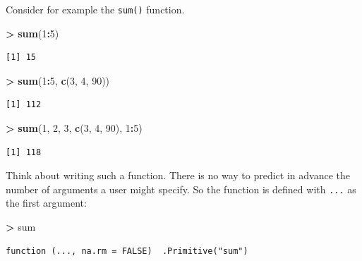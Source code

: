 \documentclass[]{krantz}
\makeatletter
\newenvironment{Shaded}{\begin{snugshade}}{\end{snugshade}}
\newcommand{\KeywordTok}[1]{\textcolor[rgb]{0.27,0.27,0.27}{\textbf{#1}}}
\newcommand{\DecValTok}[1]{\textcolor[rgb]{0.06,0.06,0.06}{#1}}
\newcommand{\StringTok}[1]{\textcolor[rgb]{0.5,0.5,0.5}{#1}}
\newcommand{\OperatorTok}[1]{\textcolor[rgb]{0.43,0.43,0.43}{\textbf{#1}}}
\newcommand{\NormalTok}[1]{#1}
\newenvironment{kframe}{%
\medskip{}
\setlength{\fboxsep}{.8em}
 \def\at@end@of@kframe{}%
 \ifinner\ifhmode%
  \def\at@end@of@kframe{\end{minipage}}%
  \begin{minipage}{\columnwidth}%
 \fi\fi%
 \def\FrameCommand##1{\hskip\@totalleftmargin \hskip-\fboxsep
 \colorbox{shadecolor}{##1}\hskip-\fboxsep
     \hskip-\linewidth \hskip-\@totalleftmargin \hskip\columnwidth}%
 \MakeFramed {\advance\hsize-\width
   \@totalleftmargin\z@ \linewidth\hsize
   \@setminipage}}%
 {\par\unskip\endMakeFramed%
 \at@end@of@kframe}
\renewenvironment{Shaded}{\begin{kframe}}{\end{kframe}}
\theoremstyle{definition}
\theoremstyle{definition}
\theoremstyle{definition}
\theoremstyle{remark}
\makeatother
\begin{document}
Consider for example the \texttt{sum()} function.

\begin{Shaded}
\begin{Highlighting}[]
\OperatorTok{>}\StringTok{ }\KeywordTok{sum}\NormalTok{(}\DecValTok{1}\OperatorTok{:}\DecValTok{5}\NormalTok{)}
\end{Highlighting}
\end{Shaded}

\begin{verbatim}
[1] 15
\end{verbatim}

\begin{Shaded}
\begin{Highlighting}[]
\OperatorTok{>}\StringTok{ }\KeywordTok{sum}\NormalTok{(}\DecValTok{1}\OperatorTok{:}\DecValTok{5}\NormalTok{, }\KeywordTok{c}\NormalTok{(}\DecValTok{3}\NormalTok{, }\DecValTok{4}\NormalTok{, }\DecValTok{90}\NormalTok{))}
\end{Highlighting}
\end{Shaded}

\begin{verbatim}
[1] 112
\end{verbatim}

\begin{Shaded}
\begin{Highlighting}[]
\OperatorTok{>}\StringTok{ }\KeywordTok{sum}\NormalTok{(}\DecValTok{1}\NormalTok{, }\DecValTok{2}\NormalTok{, }\DecValTok{3}\NormalTok{, }\KeywordTok{c}\NormalTok{(}\DecValTok{3}\NormalTok{, }\DecValTok{4}\NormalTok{, }\DecValTok{90}\NormalTok{), }\DecValTok{1}\OperatorTok{:}\DecValTok{5}\NormalTok{)}
\end{Highlighting}
\end{Shaded}

\begin{verbatim}
[1] 118
\end{verbatim}

Think about writing such a function. There is no way to predict in
advance the number of arguments a user might specify. So the function is
defined with \texttt{...} as the first argument:

\begin{Shaded}
\begin{Highlighting}[]
\OperatorTok{>}\StringTok{ }\NormalTok{sum}
\end{Highlighting}
\end{Shaded}

\begin{verbatim}
function (..., na.rm = FALSE)  .Primitive("sum")
\end{verbatim}
\end{document}
